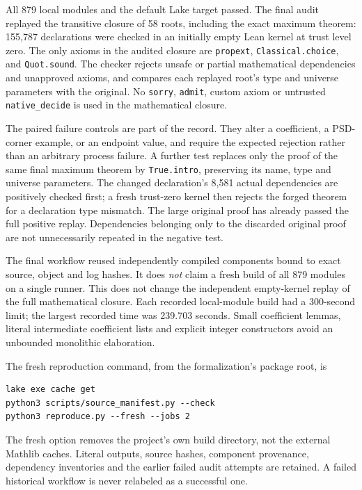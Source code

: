 \documentclass[11pt]{article}
\theoremstyle{remark}\newtheorem{remark}[theorem]{Remark}
\begin{document}
All 879 local modules and the default Lake target passed. The final audit replayed the transitive closure of 58 roots, including the exact maximum theorem: 155,787 declarations were checked in an initially empty Lean kernel at trust level zero. The only axioms in the audited closure are \texttt{propext}, \texttt{Classical.choice}, and \texttt{Quot.sound}. The checker rejects unsafe or partial mathematical dependencies and unapproved axioms, and compares each replayed root's type and universe parameters with the original. No \texttt{sorry}, \texttt{admit}, custom axiom or untrusted \texttt{native\_decide} is used in the mathematical closure.

The paired failure controls are part of the record. They alter a coefficient, a PSD-corner example, or an endpoint value, and require the expected rejection rather than an arbitrary process failure. A further test replaces only the proof of the same final maximum theorem by \texttt{True.intro}, preserving its name, type and universe parameters. The changed declaration's 8,581 actual dependencies are positively checked first; a fresh trust-zero kernel then rejects the forged theorem for a declaration type mismatch. The large original proof has already passed the full positive replay. Dependencies belonging only to the discarded original proof are not unnecessarily repeated in the negative test.

The final workflow reused independently compiled components bound to exact source, object and log hashes. It does \emph{not} claim a fresh build of all 879 modules on a single runner. This does not change the independent empty-kernel replay of the full mathematical closure. Each recorded local-module build had a 300-second limit; the largest recorded time was 239.703 seconds. Small coefficient lemmas, literal intermediate coefficient lists and explicit integer constructors avoid an unbounded monolithic elaboration.

The fresh reproduction command, from the formalization's package root, is
\begin{verbatim}
lake exe cache get
python3 scripts/source_manifest.py --check
python3 reproduce.py --fresh --jobs 2
\end{verbatim}
The fresh option removes the project's own build directory, not the external Mathlib caches. Literal outputs, source hashes, component provenance, dependency inventories and the earlier failed audit attempts are retained. A failed historical workflow is never relabeled as a successful one.
\end{document}
